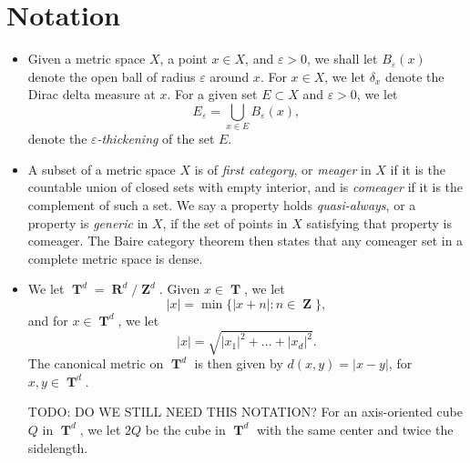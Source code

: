 \documentclass[dvipsnames,letterpaper,12pt]{article}
\numberwithin{equation}{section}
\DeclareMathOperator{\RR}{\mathbf{R}}
\DeclareMathOperator{\ZZ}{\mathbf{Z}}
\DeclareMathOperator{\TT}{\mathbf{T}}
\newtheorem{theorem}{Theorem}
\numberwithin{theorem}{section}
\begin{document}

\section{Notation} \label{notationSection}

\begin{itemize}

    \item Given a metric space $X$, a point $x \in X$, and $\varepsilon > 0$, we shall let $B_\varepsilon(x)$ denote the open ball of radius $\varepsilon$ around $x$. For $x \in X$, we let $\delta_x$ denote the Dirac delta measure at $x$. For a given set $E \subset X$ and $\varepsilon > 0$, we let
    \[ E_\varepsilon = \bigcup_{x \in E} B_\varepsilon(x), \]
    denote the \emph{$\varepsilon$-thickening} of the set $E$.

    \item A subset of a metric space $X$ is of \emph{first category}, or \emph{meager} in $X$ if it is the countable union of closed sets with empty interior, and is \emph{comeager} if it is the complement of such a set. We say a property holds \emph{quasi-always}, or a property is \emph{generic} in $X$, if the set of points in $X$ satisfying that property is comeager. The Baire category theorem then states that any comeager set in a complete metric space is dense.

    \item We let $\TT^d = \RR^d/\ZZ^d$. Given $x \in \TT$, we let
    \[ |x| = \min \{ |x + n| : n \in \ZZ \}, \]
    and for $x \in \TT^d$, we let
    \[ |x| = \sqrt{|x_1|^2 + \dots + |x_d|^2}. \]
    The canonical metric on $\TT^d$ is then given by $d(x,y) = |x - y|$, for $x,y \in \TT^d$.

    TODO: DO WE STILL NEED THIS NOTATION?
    For an axis-oriented cube $Q$ in $\TT^d$, we let $2Q$ be the cube in $\TT^d$ with the same center and twice the sidelength.


\end{itemize}
\end{document}
